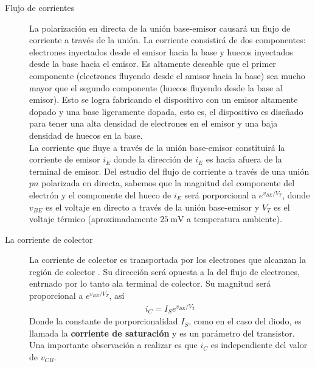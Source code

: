 \documentclass{article}
\begin{document}
\begin{description}
	\item[Flujo de corrientes] La polarización en directa de la unión base-emisor causará un flujo de corriente a través de la unión. La corriente consistirá de dos componentes: electrones inyectados desde el emisor hacia la base y huecos inyectados desde la base hacia el emisor. Es altamente deseable que el primer componente (electrones fluyendo desde el amisor hacia la base) sea mucho mayor que el segundo componente (huecos fluyendo desde la base al emisor). Esto se logra fabricando el dispositivo con un emisor altamente dopado y una base ligeramente dopada, esto es, el dispositivo es diseñado para tener una alta densidad de electrones en el emisor y una baja densidad de huecos en la base.\\
	La corriente que fluye a través de la unión base-emisor constituirá la corriente de emisor $i_E$ donde la dirección de $i_E$ es hacia afuera de la terminal de emisor. Del estudio del flujo de corriente a través de una unión $pn$ polarizada en directa, sabemos que la magnitud del componente del electrón y el componente del hueco de $i_E$ será porporcional a $e^{v_{BE}/V_T}$, donde $v_{BE}$ es el voltaje en directo a través de la unión base-emisor y $V_T$ es el voltaje térmico (aproximadamente $\qty{25}{\milli \volt}$ a temperatura ambiente).
	
	\item[La corriente de colector] La corriente de colector es transportada por los electrones que alcanzan la región de colector . Su dirección será opuesta a la del flujo de electrones, entrnado por lo tanto  ala terminal de colector. Su magnitud será proporcional a $e^{v_{BE}/V_T}$, así
	\begin{align}
		i_C = I_S e^{v_{BE}/V_T}
	\end{align}
	Donde la constante de porporcionalidad $I_S$, como en el caso del diodo, es llamada la \textbf{corriente de saturación} y es un parámetro del transistor. Una importante observación a realizar es que $i_C$ es independiente del valor de $v_{CB}$.
	

\end{description}
\end{document}
